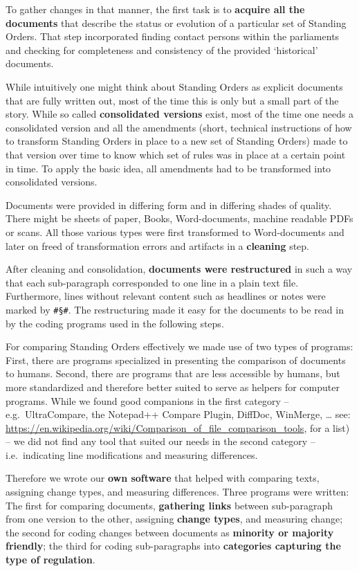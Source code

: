 \documentclass[10pt,]{article}
\begin{document}
To gather changes in that manner, the first task is to \textbf{acquire
all the documents} that describe the status or evolution of a particular
set of Standing Orders. That step incorporated finding contact persons
within the parliaments and checking for completeness and consistency of
the provided `historical' documents.

While intuitively one might think about Standing Orders as explicit
documents that are fully written out, most of the time this is only but
a small part of the story. While so called \textbf{consolidated
versions} exist, most of the time one needs a consolidated version and
all the amendments (short, technical instructions of how to transform
Standing Orders in place to a new set of Standing Orders) made to that
version over time to know which set of rules was in place at a certain
point in time. To apply the basic idea, all amendments had to be
transformed into consolidated versions.

Documents were provided in differing form and in differing shades of
quality. There might be sheets of paper, Books, Word-documents, machine
readable PDFs or scans. All those various types were first transformed
to Word-documents and later on freed of transformation errors and
artifacts in a \textbf{cleaning} step.

After cleaning and consolidation, \textbf{documents were restructured}
in such a way that each sub-paragraph corresponded to one line in a
plain text file. Furthermore, lines without relevant content such as
headlines or notes were marked by \texttt{\#§\#}. The restructuring made
it easy for the documents to be read in by the coding programs used in
the following steps.

For comparing Standing Orders effectively we made use of two types of
programs: First, there are programs specialized in presenting the
comparison of documents to humans. Second, there are programs that are
less accessible by humans, but more standardized and therefore better
suited to serve as helpers for computer programs. While we found good
companions in the first category -- e.g.~UltraCompare, the Notepad++
Compare Plugin, DiffDoc, WinMerge, \ldots{} see:
\url{https://en.wikipedia.org/wiki/Comparison_of_file_comparison_tools},
for a list) -- we did not find any tool that suited our needs in the
second category -- i.e.~indicating line modifications and measuring
differences.

Therefore we wrote our \textbf{own software} that helped with comparing
texts, assigning change types, and measuring differences. Three programs
were written: The first for comparing documents, \textbf{gathering
links} between sub-paragraph from one version to the other, assigning
\textbf{change types}, and measuring change; the second for coding
changes between documents as \textbf{minority or majority friendly}; the
third for coding sub-paragraphs into \textbf{categories capturing the
type of regulation}.
\end{document}
